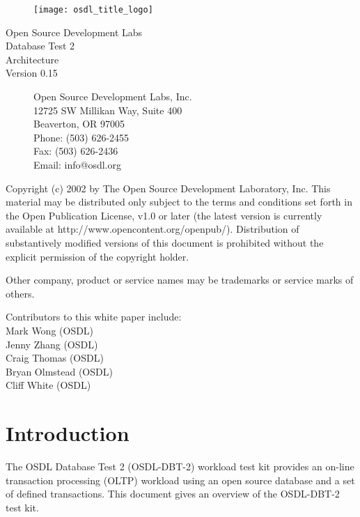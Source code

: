 \documentclass{article}
\begin{document}
\begin{titlepage}

\begin{figure}[t]
\centering
\texttt{[image: osdl\_title\_logo]}
\end{figure}

\centering
\huge
Open Source Development Labs \\
Database Test 2 \\
\Huge
Architecture \\
\LARGE
Version 0.15

\begin{figure}[b]
\flushleft
\normalsize
Open Source Development Labs, Inc.\\
12725 SW Millikan Way, Suite 400\\
Beaverton, OR 97005\\
Phone: (503) 626-2455\\
Fax: (503) 626-2436\\
Email: info@osdl.org
\end{figure}

\end{titlepage}

Copyright (c) 2002 by The Open Source Development Laboratory, Inc. This
material may be distributed only subject to the terms and conditions set forth
in the Open Publication License, v1.0 or later (the latest version is currently
available at http://www.opencontent.org/openpub/). Distribution of
substantively modified versions of this document is prohibited without the
explicit permission of the copyright holder.

Other company, product or service names may be trademarks or service marks of
others.

Contributors to this white paper include: \\
Mark Wong (OSDL) \\
Jenny Zhang (OSDL) \\
Craig Thomas (OSDL) \\
Bryan Olmstead (OSDL) \\
Cliff White (OSDL) \\

\pagebreak

\section{Introduction}

The OSDL Database Test 2 (OSDL-DBT-2) workload test kit provides an on-line
transaction processing (OLTP) workload using an open source database and a
set of defined transactions.  This document gives an overview of the
OSDL-DBT-2 test kit.
\end{document}

